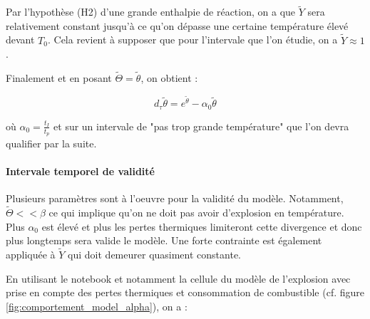 \documentclass[10pt,a4paper,twocolumn]{report}
\begin{document}
	Par l'hypothèse (H2) d'une grande enthalpie de réaction, on a que $\tilde{Y}$ sera relativement constant jusqu'à ce qu'on dépasse une certaine température élevé devant $T_0$. Cela revient à supposer que pour l'intervale que l'on étudie, on a $\tilde{Y} \approx 1$.
	
	Finalement et en posant $\tilde{\Theta} = \tilde{\theta}$, on obtient :
	
	$$ d_\tau\tilde{\theta} = e^{\tilde{\theta}} - \alpha_0 \tilde{\theta} $$ 
	
	où $\alpha_0 = \frac{t_I}{t_p}$ et sur un intervale de "pas trop grande température" que l'on devra qualifier par la suite.
	
	\paragraph{Intervale temporel de validité}
	
	Plusieurs paramètres sont à l'oeuvre pour la validité du modèle. Notamment, $\tilde{\Theta} << \beta $ ce qui implique qu'on ne doit pas avoir d'explosion en température. Plus $\alpha_0$ est élevé et plus les pertes thermiques limiteront cette divergence et donc plus longtemps sera valide le modèle.
	Une forte contrainte est également appliquée à $\tilde{Y}$ qui doit demeurer quasiment constante.
	
	En utilisant le notebook et notamment la cellule du modèle de l'explosion avec prise en compte des pertes thermiques et consommation de combustible (cf. figure \ref{fig:comportement_model_alpha}), on a :
	
\end{document}
